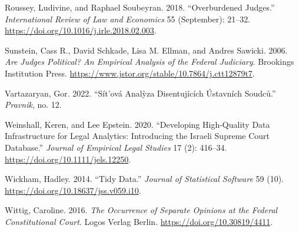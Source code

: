 \documentclass[
  11pt,
]{article}
\newlength{\cslhangindent}
\newenvironment{CSLReferences}[2] %
 {%
  \setlength{\parindent}{0pt}
  \ifodd #1 \everypar{\setlength{\hangindent}{\cslhangindent}}\ignorespaces\fi
  \ifnum #2 > 0
  \setlength{\parskip}{#2\baselineskip}
  \fi
 }%
 {}
\begin{document}
\begin{CSLReferences}{1}{0}
\leavevmode{}%
Roussey, Ludivine, and Raphael Soubeyran. 2018. {``Overburdened
Judges.''} \emph{International Review of Law and Economics} 55
(September): 21--32. \url{https://doi.org/10.1016/j.irle.2018.02.003}.

\leavevmode{}%
Sunstein, Cass R., David Schkade, Lisa M. Ellman, and Andres Sawicki.
2006. \emph{Are {Judges Political}? {An Empirical Analysis} of the
{Federal Judiciary}}. {Brookings Institution Press}.
\url{https://www.jstor.org/stable/10.7864/j.ctt12879t7}.

\leavevmode{}%
Vartazaryan, Gor. 2022. {``Sít'ová Analỳza Disentujících Ústavních
Soudců.''} \emph{Pravnik}, no. 12.

\leavevmode{}%
Weinshall, Keren, and Lee Epstein. 2020. {``Developing {High-Quality
Data Infrastructure} for {Legal Analytics}: {Introducing} the {Israeli
Supreme Court Database}.''} \emph{Journal of Empirical Legal Studies} 17
(2): 416--34. \url{https://doi.org/10.1111/jels.12250}.

\leavevmode{}%
Wickham, Hadley. 2014. {``Tidy {Data}.''} \emph{Journal of Statistical
Software} 59 (10). \url{https://doi.org/10.18637/jss.v059.i10}.

\leavevmode{}%
Wittig, Caroline. 2016. \emph{The {Occurrence} of {Separate Opinions} at
the {Federal Constitutional Court}}. {Logos Verlag Berlin}.
\url{https://doi.org/10.30819/4411}.

\end{CSLReferences}
\end{document}
